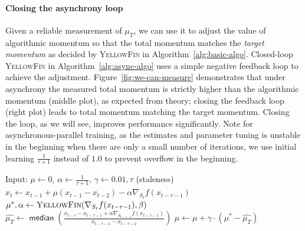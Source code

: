 \documentclass{article}
\newcommand{\tuner}{\textsc{YellowFin}\xspace}
\newcommand{\Asynctuner}{Closed-loop \textsc{YellowFin}\xspace}
\begin{document}
\paragraph{Closing the asynchrony loop}
Given a reliable measurement of $\mu_{T}$, 
we can use it to adjust the value of algorithmic momentum so that the total momentum matches the \emph{target momentum} as decided by \tuner in Algorithm~\ref{alg:basic-algo}.
\Asynctuner in Algorithm~\ref{alg:async-algo} %
uses a simple negative feedback loop to achieve the adjustment.
Figure~\ref{fig:we-can-measure} demonstrates that under asynchrony the measured total momentum is strictly higher than the algorithmic momentum (middle plot), as expected from theory;
closing the feedback loop (right plot) leads to total momentum matching the target momentum.
Closing the loop, as we will see, improves performance significantly.
Note for asynchronous-parallel training, as the estimates and parameter tuning is unstable in the beginning when there are only a small number of iterations, we use initial learning $\frac{1}{\tau + 1}$ instead of $1.0$ to prevent overflow in the beginning. 
\begin{algorithm}[H]
	\caption{\Asynctuner}
	\begin{algorithmic}[1]
	\State Input: $\mu\gets0$, $\alpha \gets \frac{1}{\tau + 1}$, $\gamma\gets0.01, \tau$ (staleness)
	\State $x_t\!\gets\!x_{t - 1} + \mu (x_{t - 1} - x_{t - 2} ) - \alpha \nabla_{S_t} f(x_{t - \tau - 1} )$
	\State $\mu^*,\alpha \gets \Call{\tuner}{\nabla_{S_t} f(x_{t - \tau - 1} ), \beta}$ %
	\State $\hat{\mu_T} 
					\gets \mathop{\mathsf{median}}\left(
							\frac{x_{t - \tau} - x_{t - \tau-1} + \alpha \nabla_{S_{t-\tau-1}} f(x_{t - \tau - 1} )}
							{x_{t - \tau-1} - x_{t - \tau-2}}
					\right)$ 
	\State $\mu \leftarrow \mu + \gamma \cdot (\mu^* - \hat{\mu_T})$ 
	\EndFor
\end{algorithmic}
\label{alg:async-algo}
\end{algorithm}






\vspace{-0.25em}
\end{document}
